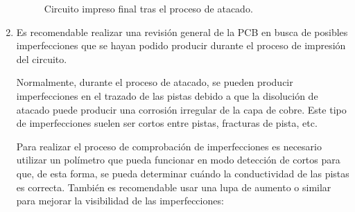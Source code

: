 \begin{enumerate}
    \begin{figure}[H]
    \centering
    \caption{Circuito impreso final tras el proceso de atacado.}
    \end{figure}
    
    \item Es recomendable realizar una revisión general de la \ac{PCB} en busca de posibles imperfecciones que se hayan podido producir durante el proceso de impresión del circuito.
    
    Normalmente, durante el proceso de atacado, se pueden producir imperfecciones en el trazado de las pistas debido a que la disolución de atacado puede producir una corrosión irregular de la capa de cobre. Este tipo de imperfecciones suelen ser cortos entre pistas, fracturas de pista, etc.
    
    Para realizar el proceso de comprobación de imperfecciones es necesario utilizar un polímetro que pueda funcionar en modo detección de cortos para que, de esta forma, se pueda determinar cuándo la conductividad de las pistas es correcta. También es recomendable usar una lupa de aumento o similar para mejorar la visibilidad de las imperfecciones:
    

\end{enumerate}
